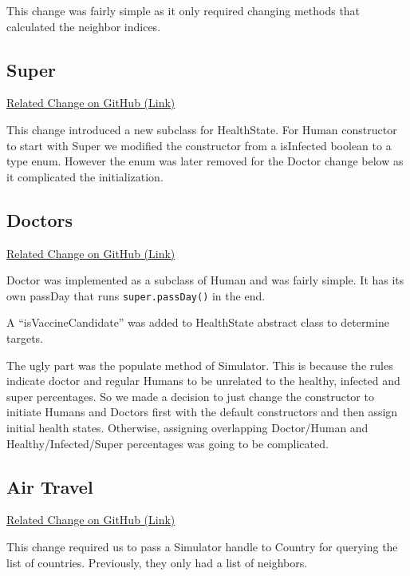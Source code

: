 \documentclass[]{article}
\begin{document}
This change was fairly simple as it only required changing methods that
calculated the neighbor indices.

\subsection{Super}\label{super}

\href{https://github.com/ozusrl/CS534-kivanccakmak-okanpalaz/commit/28ae1e4e1043619a4b947b959962962ce707260c}{Related
Change on GitHub (Link)}

This change introduced a new subclass for HealthState. For Human
constructor to start with Super we modified the constructor from a
isInfected boolean to a type enum. However the enum was later removed
for the Doctor change below as it complicated the initialization.

\subsection{Doctors}\label{doctors}

\href{https://github.com/ozusrl/CS534-kivanccakmak-okanpalaz/commit/5e09ceda9b9bde3a40f469fe9705150255f5d9a5}{Related
Change on GitHub (Link)}

Doctor was implemented as a subclass of Human and was fairly simple. It
has its own passDay that runs \texttt{super.passDay()} in the end.

A ``isVaccineCandidate'' was added to HealthState abstract class to
determine targets.

The ugly part was the populate method of Simulator. This is because the
rules indicate doctor and regular Humans to be unrelated to the healthy,
infected and super percentages. So we made a decision to just change the
constructor to initiate Humans and Doctors first with the default
constructors and then assign initial health states. Otherwise, assigning
overlapping Doctor/Human and Healthy/Infected/Super percentages was
going to be complicated.

\subsection{Air Travel}\label{air-travel}

\href{https://github.com/ozusrl/CS534-kivanccakmak-okanpalaz/commit/882c76ba24abf62756eb4cacd3f5f828fe21f1e6}{Related
Change on GitHub (Link)}

This change required us to pass a Simulator handle to Country for
querying the list of countries. Previously, they only had a list of
neighbors.
\end{document}
